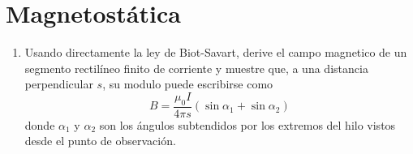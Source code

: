 \documentclass[]{article}
\numberwithin{equation}{section}
\newcommand{\0}{\textcolor{gray}{0}}
\newcommand{\uo}{\mu_{0}}
\begin{document}
\section{Magnetostática}
\begin{enumerate}
	\item Usando directamente la ley de Biot-Savart, derive el campo magnetico de un segmento rectilíneo finito de corriente y muestre que, a una distancia perpendicular \(s\), su modulo puede escribirse como
	\begin{equation*}
		B = \frac{\uo I}{4\pi s}\left(\sin\alpha_1 + \sin\alpha_2\right)
	\end{equation*}
	donde \(\alpha_1\) y \(\alpha_2\) son los ángulos subtendidos por los extremos del hilo vistos desde el punto de observación.
	
	\begin{figure}[h!]
		\centering
		\begin{tikzpicture}[x=0.75pt,y=0.75pt,yscale=-1,xscale=1]
			

\end{tikzpicture}
\end{figure}
\end{enumerate}
\end{document}
